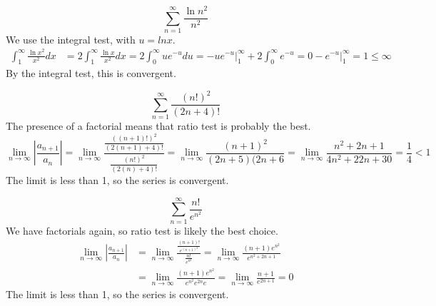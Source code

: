 \documentclass[fleqn]{report}
\begin{document}
\begin{example}
\begin{equation*}
\sum_{n=1}^\infty \frac{\ln n^2}{n^2}
\end{equation*}
We use the integral test, with $u = ln x$.
\begin{align*}
\int_1^\infty \frac{\ln x^2}{x^2} dx & = 2 \int_1^\infty
\frac{\ln x}{x^2} dx = 2 \int_0^\infty u e^{-u} du
= \left. - ue^{-u} \right|_1^\infty + 2 \int_0^\infty
e^{-u} = 0 - \left. e^{-u} \right|_1^\infty = 1 \leq \infty
\end{align*}
By the integral test, this is convergent.
\end{example}

\begin{example}
\begin{equation*}
\sum_{n=1}^\infty \frac{(n!)^2}{(2n+4)!}
\end{equation*}
The presence of a factorial means that ratio test is probably
the best.
\begin{equation*}
\lim_{n \rightarrow \infty} \left| \frac{a_{n+1}}{a_n} \right|
= \lim_{n \rightarrow \infty}
\frac{\frac{((n+1)!)^2}{(2(n+1)+4)!}}{\frac{(n!)^2}{(2(n)+4)!}}
= \lim_{n \rightarrow \infty} \frac{(n+1)^2}{(2n+5)(2n+6} 
= \lim_{n \rightarrow \infty} \frac{n^2+2n+1}{4n^2+ 22n + 30}
= \frac{1}{4} < 1
\end{equation*}
The limit is less than 1, so the series is convergent. 
\end{example}

\begin{example}
\begin{equation*}
\sum_{n=1}^\infty \frac{n!}{e^{n^2}}
\end{equation*}
We have factorials again, so ratio test is likely the best
choice.
\begin{align*}
\lim_{n \rightarrow \infty} \left| \frac{a_{n+1}}{a_n} \right|
& = \lim_{n \rightarrow \infty}
\frac{\frac{(n+1)!}{e^{(n+1)^2}}}{\frac{n!}{e^{n^2}}} 
= \lim_{n \rightarrow \infty}
\frac{(n+1)e^{n^2}}{e^{n^2+2n+1}} \\
& = \lim_{n \rightarrow \infty} \frac{(n+1)e^{n^2}}{e^{n^2}
e^{2n} e} 
= \lim_{n \rightarrow \infty} \frac{n+1}{e^{2n+1}} = 0 
\end{align*}
The limit is less than 1, so the series is convergent. 
\end{example}
\end{document}
